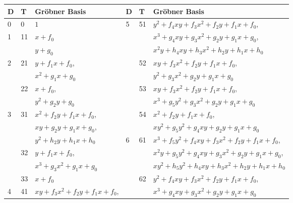 \begin{table}[hb!]
\label{tab_divisor_types}
\begin{center}
\begin{tabular}{l|l|l||l|l|l}
  D & T & Gr\"obner Basis & D & T & Gr\"obner Basis \\
  \hline
  0 & 0 & $1$ & \multirow{9}{*}{5} &\multirow{3}{*}{51} & $y^2 + f_4xy + f_3x^2 + f_2y + f_1x + f_0$, \\
  \cline{1-3}
  \multirow{2}{*}{1} &\multirow{2}{*}{11} & $x + f_0$ & & & $x^3 + g_4xy + g_3x^2 + g_2y + g_1x + g_0$, \\
    & & $y + g_0$ & & & $x^2y + h_4xy + h_3x^2 + h_2y + h_1x + h_0$ \\
  \cline{1-3}\cline{5-6}
  \multirow{4}{*}{2} &\multirow{2}{*}{21} & $y + f_1x + f_0$, & & \multirow{2}{*}{52} & $xy + f_3x^2 + f_2y + f_1x + f_0$, \\
    & & $x^2 + g_1x + g_0$ & & & $y^2 + g_3x^2 + g_2y + g_1x + g_0$ \\
    \cline{2-3}\cline{5-6}
    &\multirow{2}{*}{22}  & $x + f_0$, & & \multirow{2}{*}{53} & $xy + f_3x^2 + f_2y + f_1x + f_0$, \\
    & & $y^2 + g_2y + g_0$ & & & $x^3 + g_5y^2 + g_3x^2 + g_2y + g_1x + g_0$ \\
  \cline{1-3}\cline{5-6}
  \multirow{6}{*}{3} &\multirow{3}{*}{31} & $x^2 + f_2y + f_1x + f_0$, & & \multirow{2}{*}{54} & $x^2 + f_2y + f_1x + f_0$, \\
    & & $xy + g_2y + g_1x + g_0$, & & & $xy^2 + g_5y^2 + g_4xy + g_2y + g_1x + g_0$ \\
  \cline{4-6}
    & & $y^2 + h_2y + h_1x + h_0$ & \multirow{10}{*}{6} &\multirow{3}{*}{61} & $x^3 + f_5y^2 + f_4xy + f_3x^2 + f_2y + f_1x + f_0$, \\
    \cline{2-3}
    &\multirow{2}{*}{32} & $y + f_1x + f_0$, & & & $x^2y + g_5y^2 + g_4xy + g_3x^2 + g_2y + g_1x + g_0$, \\
    & & $x^3 + g_3x^2 + g_1x + g_0$ & & & $xy^2 + h_5y^2 + h_4xy + h_3x^2 + h_2y + h_1x + h_0$ \\
    \cline{2-3}\cline{5-6}
    &\multirow{1}{*}{33} & $x + f_0$ & &\multirow{2}{*}{62} & $y^2 + f_4xy + f_3x^2 + f_2y + f_1x + f_0$, \\
  \cline{1-3}
  \multirow{8}{*}{4} &\multirow{3}{*}{41} & $xy + f_3x^2 + f_2y + f_1x + f_0$, & & & $x^3 + g_4xy + g_3x^2 + g_2y + g_1x + g_0$ \\
  \cline{5-6}

\end{tabular}
\end{center}
\end{table}
